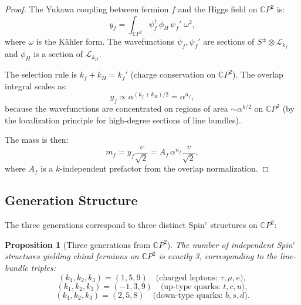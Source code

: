 \documentclass[11pt,a4paper]{article}
\newtheorem{proposition}[theorem]{Proposition}
\theoremstyle{remark}
\newcommand{\CP}{\mathbb{C}P}
\begin{document}
\begin{proof}
The Yukawa coupling between fermion $f$ and the Higgs field on $\CP^2$ is:
\begin{equation}
y_f = \int_{\CP^2} \psi_f^\dagger\,\phi_H\,\psi_f'\;\omega^2,
\end{equation}
where $\omega$ is the K\"ahler form. The wavefunctions $\psi_f, \psi_f'$
are sections of $S^\pm \otimes \mathcal{L}_{k_f}$ and $\phi_H$ is a section
of $\mathcal{L}_{k_H}$.

The selection rule is $k_f + k_H = k_f'$ (charge conservation on $\CP^2$).
The overlap integral scales as:
\begin{equation}
y_f \propto \alpha^{(k_f + k_H)/2} = \alpha^{n_f},
\end{equation}
because the wavefunctions are concentrated on regions of area
$\sim \alpha^{k/2}$ on $\CP^2$ (by the localization principle for
high-degree sections of line bundles).

The mass is then:
\begin{equation}
m_f = y_f \frac{v}{\sqrt{2}} = A_f\,\alpha^{n_f}\frac{v}{\sqrt{2}},
\end{equation}
where $A_f$ is a $k$-independent prefactor from the overlap normalization.
\end{proof}

\subsection{Generation Structure}

The three generations correspond to three distinct Spin$^c$ structures
on $\CP^2$:

\begin{proposition}[Three generations from $\CP^2$]
\label{prop:three-gen}
The number of independent Spin$^c$ structures yielding chiral fermions
on $\CP^2$ is exactly 3, corresponding to the line-bundle triples:
\begin{equation}
(k_1, k_2, k_3) = (1, 5, 9) \quad\text{(charged leptons: $\tau, \mu, e$)},
\end{equation}
\begin{equation}
(k_1, k_2, k_3) = (-1, 3, 9) \quad\text{(up-type quarks: $t, c, u$)},
\end{equation}
\begin{equation}
(k_1, k_2, k_3) = (2, 5, 8) \quad\text{(down-type quarks: $b, s, d$)}.
\end{equation}
\end{proposition}
\end{document}
